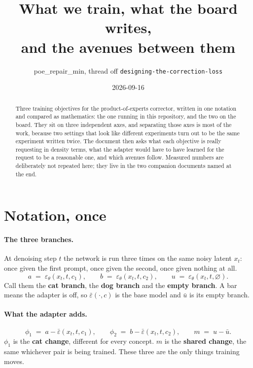 \documentclass[11pt]{article}
\title{What we train, what the board writes,\\ and the avenues between them}
\author{poe\_repair\_min, thread off \texttt{designing-the-correction-loss}}
\date{2026-09-16}
\newcommand{\eps}{\varepsilon}
\newcommand{\epsth}{\eps_\theta}
\newcommand{\epsfr}{\bar\eps}
\newcommand{\xt}{x_t}
\newcommand{\cnull}{\varnothing}
\begin{document}
\maketitle

\begin{abstract}
Three training objectives for the product-of-experts corrector, written in one notation and
compared as mathematics: the one running in this repository, and the two on the board. They sit on
three independent axes, and separating those axes is most of the work, because two settings that
look like different experiments turn out to be the same experiment written twice. The document
then asks what each objective is really requesting in density terms, what the adapter would have to
have learned for the request to be a reasonable one, and which avenues follow. Measured numbers are
deliberately not repeated here; they live in the two companion documents named at the end.
\end{abstract}

\tableofcontents

\section{Notation, once}
\label{sec:words}

\paragraph{The three branches.}
At denoising step $t$ the network is run three times on the same noisy latent $\xt$: once given the
first prompt, once given the second, once given nothing at all.
\begin{equation}
  a \;=\; \epsth(\xt,t,c_1), \qquad
  b \;=\; \epsth(\xt,t,c_2), \qquad
  u \;=\; \epsth(\xt,t,\cnull).
\end{equation}
Call them the \textbf{cat branch}, the \textbf{dog branch} and the \textbf{empty branch}. A bar
means the adapter is off, so $\epsfr(\cdot,c)$ is the base model and $\bar u$ is its empty branch.

\paragraph{What the adapter adds.}
\begin{equation}
  \phi_1 \;=\; a - \epsfr(\xt,t,c_1), \qquad
  \phi_2 \;=\; b - \epsfr(\xt,t,c_2), \qquad
  m \;=\; u - \bar u .
  \label{eq:changes}
\end{equation}
$\phi_1$ is the \textbf{cat change}, different for every concept. $m$ is the \textbf{shared
change}, the same whichever pair is being trained. These three are the only things training moves.
\end{document}
